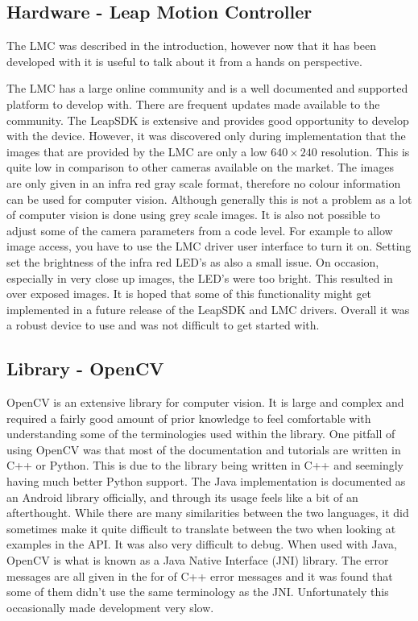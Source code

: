 \documentclass[11pt,oneside]{report}
\begin{document}
		\subsection{Hardware - Leap Motion Controller}
			The LMC was described in the introduction, however now that it has been developed with it is useful to talk about it from a hands on perspective.
			
			The LMC has a large online community and is a well documented and supported platform to develop with.
			There are frequent updates made available to the community.
			The LeapSDK is extensive and provides good opportunity to develop with the device.
			However, it was discovered only during implementation that the images that are provided by the LMC are only a low $640\times240$ resolution.
			This is quite low in comparison to other cameras available on the market.
			The images are only given in an infra red gray scale format, therefore no colour information can be used for computer vision.
			Although generally this is not a problem as a lot of computer vision is done using grey scale images.
			It is also not possible to adjust some of the camera parameters from a code level.
			For example to allow image access, you have to use the LMC driver user interface to turn it on.
			Setting set the brightness of the infra red LED's as also a small issue.
			On occasion, especially in very close up images, the LED's were too bright.
			This resulted in over exposed images.
			It is hoped that some of this functionality might get implemented in a future release of the LeapSDK and LMC drivers.
			Overall it was a robust device to use and was not difficult to get started with.
		\subsection{Library - OpenCV}
			OpenCV is an extensive library for computer vision.
			It is large and complex and required a fairly good amount of prior knowledge to feel comfortable with understanding some of the terminologies used within the library.
			One pitfall of using OpenCV was that most of the documentation and tutorials are written in C++ or Python.
			This is due to the library being written in C++ and seemingly having much better Python support.
			The Java implementation is documented as an Android library officially, and through its usage feels like a bit of an afterthought.
			While there are many similarities between the two languages, it did sometimes make it quite difficult to translate between the two when looking at examples in the API.
			It was also very difficult to debug.
			When used with Java, OpenCV is what is known as a Java Native Interface (JNI) library.
			The error messages are all given in the for of C++ error messages and it was found that some of them didn't use the same terminology as the JNI.
			Unfortunately this occasionally made development very slow.
			
\end{document}
